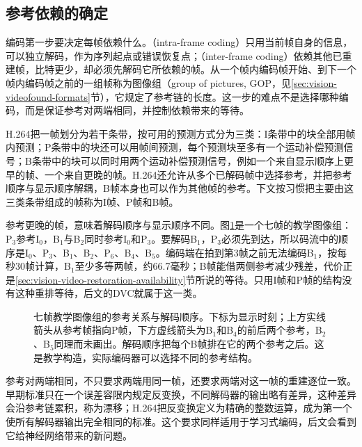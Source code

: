 \subsection{参考依赖的确定}
\label{sec:vision-video-codec-reference}
\label{sec:vision-video-dvc}

编码第一步要决定每帧依赖什么。（intra-frame coding）只用当前帧自身的信息，可以独立解码，作为序列起点或错误恢复点；（inter-frame coding）依赖其他已重建帧，比特更少，却必须先解码它所依赖的帧。从一个帧内编码帧开始、到下一个帧内编码帧之前的一组帧称为图像组（group of pictures, GOP，见\ref{sec:vision-videofound-formats}节），它规定了参考链的长度。这一步的难点不是选择哪种编码，而是保证参考对两端相同，并控制依赖带来的等待。

H.264把一帧划分为若干条带，按可用的预测方式分为三类：I条带中的块全部用帧内预测；P条带中的块还可以用帧间预测，每个预测块至多有一个运动补偿预测信号；B条带中的块可以同时用两个运动补偿预测信号，例如一个来自显示顺序上更早的帧、一个来自更晚的帧。H.264还允许从多个已解码帧中选择参考，并把参考顺序与显示顺序解耦，B帧本身也可以作为其他帧的参考。下文按习惯把主要由这三类条带组成的帧称为I帧、P帧和B帧。

参考更晚的帧，意味着解码顺序与显示顺序不同。图\ref{fig:vision-video-gop-order}是一个七帧的教学图像组：P$_3$参考I$_0$，B$_1$与B$_2$同时参考I$_0$和P$_3$。要解码B$_1$，P$_3$必须先到达，所以码流中的顺序是I$_0$、P$_3$、B$_1$、B$_2$、P$_6$、B$_4$、B$_5$。编码端在拍到第3帧之前无法编码B$_1$，按每秒30帧计算，B$_1$至少多等两帧，约66.7毫秒；B帧能借两侧参考减少残差，代价正是\ref{sec:vision-video-restoration-availability}节所说的等待。只用I帧和P帧的结构没有这种重排等待，后文的DVC就属于这一类。

\begin{figure}[htbp]
  \centering
  
  \caption{七帧教学图像组的参考关系与解码顺序。下标为显示时刻；上方实线箭头从参考帧指向P帧，下方虚线箭头为B$_1$和B$_4$的前后两个参考，B$_2$、B$_5$同理而未画出。解码顺序把每个B帧排在它的两个参考之后。这是教学构造，实际编码器可以选择不同的参考结构。}
  \label{fig:vision-video-gop-order}
\end{figure}

参考对两端相同，不只要求两端用同一帧，还要求两端对这一帧的重建逐位一致。早期标准只在一个误差容限内规定反变换，不同解码器的输出略有差异，这种差异会沿参考链累积，称为漂移；H.264把反变换定义为精确的整数运算，成为第一个使所有解码器输出完全相同的标准。这个要求同样适用于学习式编码，后文会看到它给神经网络带来的新问题。

